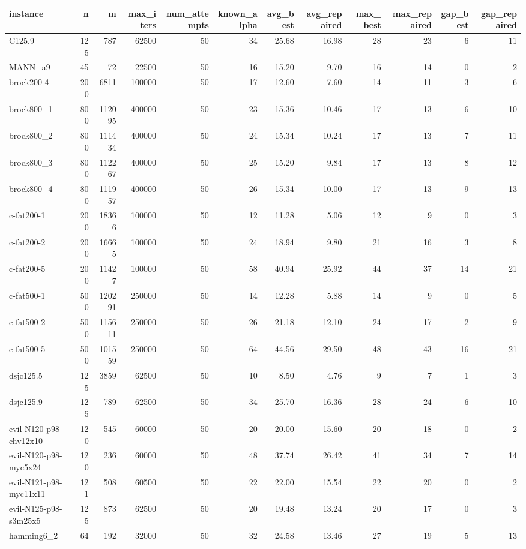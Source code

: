 \begin{tabular}{lrrrrrrrrrrr}
\toprule
instance & n & m & max\_iters & num\_attempts & known\_alpha & avg\_best & avg\_repaired & max\_best & max\_repaired & gap\_best & gap\_repaired \\
\midrule
C125.9 & 125 & 787 & 62500 & 50 & 34 & 25.68 & 16.98 & 28 & 23 & 6 & 11 \\
MANN\_a9 & 45 & 72 & 22500 & 50 & 16 & 15.20 & 9.70 & 16 & 14 & 0 & 2 \\
brock200-4 & 200 & 6811 & 100000 & 50 & 17 & 12.60 & 7.60 & 14 & 11 & 3 & 6 \\
brock800\_1 & 800 & 112095 & 400000 & 50 & 23 & 15.36 & 10.46 & 17 & 13 & 6 & 10 \\
brock800\_2 & 800 & 111434 & 400000 & 50 & 24 & 15.34 & 10.24 & 17 & 13 & 7 & 11 \\
brock800\_3 & 800 & 112267 & 400000 & 50 & 25 & 15.20 & 9.84 & 17 & 13 & 8 & 12 \\
brock800\_4 & 800 & 111957 & 400000 & 50 & 26 & 15.34 & 10.00 & 17 & 13 & 9 & 13 \\
c-fat200-1 & 200 & 18366 & 100000 & 50 & 12 & 11.28 & 5.06 & 12 & 9 & 0 & 3 \\
c-fat200-2 & 200 & 16665 & 100000 & 50 & 24 & 18.94 & 9.80 & 21 & 16 & 3 & 8 \\
c-fat200-5 & 200 & 11427 & 100000 & 50 & 58 & 40.94 & 25.92 & 44 & 37 & 14 & 21 \\
c-fat500-1 & 500 & 120291 & 250000 & 50 & 14 & 12.28 & 5.88 & 14 & 9 & 0 & 5 \\
c-fat500-2 & 500 & 115611 & 250000 & 50 & 26 & 21.18 & 12.10 & 24 & 17 & 2 & 9 \\
c-fat500-5 & 500 & 101559 & 250000 & 50 & 64 & 44.56 & 29.50 & 48 & 43 & 16 & 21 \\
dsjc125.5 & 125 & 3859 & 62500 & 50 & 10 & 8.50 & 4.76 & 9 & 7 & 1 & 3 \\
dsjc125.9 & 125 & 789 & 62500 & 50 & 34 & 25.70 & 16.36 & 28 & 24 & 6 & 10 \\
evil-N120-p98-chv12x10 & 120 & 545 & 60000 & 50 & 20 & 20.00 & 15.60 & 20 & 18 & 0 & 2 \\
evil-N120-p98-myc5x24 & 120 & 236 & 60000 & 50 & 48 & 37.74 & 26.42 & 41 & 34 & 7 & 14 \\
evil-N121-p98-myc11x11 & 121 & 508 & 60500 & 50 & 22 & 22.00 & 15.54 & 22 & 20 & 0 & 2 \\
evil-N125-p98-s3m25x5 & 125 & 873 & 62500 & 50 & 20 & 19.48 & 13.24 & 20 & 17 & 0 & 3 \\
hamming6\_2 & 64 & 192 & 32000 & 50 & 32 & 24.58 & 13.46 & 27 & 19 & 5 & 13 \\

\end{tabular}
